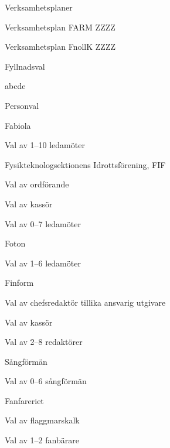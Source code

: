 \documentclass{sektionsmote}
\begin{document}
\begin{ootd}
\item{Verksamhetsplaner}
\begin{ootd}
    \item Verksamhetsplan FARM ZZZZ
    \item Verksamhetsplan FnollK ZZZZ
\end{ootd}

\item{Fyllnadsval}
\begin{ootd}
    \item abcde
\end{ootd}

\item{Personval}
\begin{ootd}
    \item Fabiola
    \begin{ootd}
        \item Val av 1--10 ledamöter
    \end{ootd}
    \item Fysikteknologsektionens Idrottsförening, FIF
    \begin{ootd}
        \item Val av ordförande
        \item Val av kassör
        \item Val av 0--7 ledamöter
    \end{ootd}
    \item Foton
    \begin{ootd}
        \item Val av 1--6 ledamöter
    \end{ootd}
    \item Finform
    \begin{ootd}
        \item Val av chefsredaktör tillika ansvarig utgivare
        \item Val av kassör
        \item Val av 2--8 redaktörer
    \end{ootd}
    \item Sångförmän
    \begin{ootd}
        \item Val av 0--6 sångförmän
    \end{ootd}
    \item Fanfareriet
    \begin{ootd}
        \item Val av flaggmarskalk
        \item Val av 1--2 fanbärare
    \end{ootd}

\end{ootd}
\end{ootd}
\end{document}
